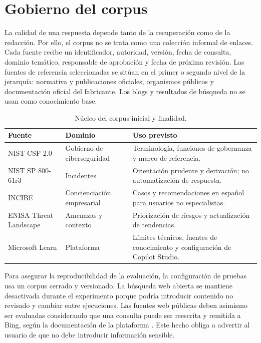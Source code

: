 \documentclass[12pt,twoside,titlepage]{book}
\begin{document}
\section{Gobierno del corpus}

La calidad de una respuesta depende tanto de la recuperaci\'on como de la redacci\'on. Por ello, el corpus no se trata como una colecci\'on informal de enlaces. Cada fuente recibe un identificador, autoridad, versi\'on, fecha de consulta, dominio tem\'atico, responsable de aprobaci\'on y fecha de pr\'oxima revisi\'on. Las fuentes de referencia seleccionadas se sit\'uan en el primer o segundo nivel de la jerarqu\'ia: normativa y publicaciones oficiales, organismos p\'ublicos y documentaci\'on oficial del fabricante. Los blogs y resultados de b\'usqueda no se usan como conocimiento base.

\begin{table}[H]
\centering
\small
\caption{N\'ucleo del corpus inicial y finalidad.}
\label{tab:corpus}
\begin{tabularx}{\textwidth}{p{}p{}X}
\toprule
\textbf{Fuente} & \textbf{Dominio} & \textbf{Uso previsto}\\
\midrule
NIST CSF 2.0 \cite{nistCsf2024} & Gobierno de ciberseguridad & Terminolog\'ia, funciones de gobernanza y marco de referencia.\\
NIST SP 800-61r3 \cite{nistIncident2025} & Incidentes & Orientaci\'on prudente y derivaci\'on; no automatizaci\'on de respuesta.\\
INCIBE \cite{incibeCrisis} & Concienciaci\'on empresarial & Casos y recomendaciones en espa\~nol para usuarios no especialistas.\\
ENISA Threat Landscape \cite{enisaThreat2025} & Amenazas y contexto & Priorizaci\'on de riesgos y actualizaci\'on de tendencias.\\
Microsoft Learn \cite{copilotKnowledge} & Plataforma & L\'imites t\'ecnicos, fuentes de conocimiento y configuraci\'on de Copilot Studio.\\
\bottomrule
\end{tabularx}
\end{table}

Para asegurar la reproducibilidad de la evaluaci\'on, la configuraci\'on de pruebas usa un corpus cerrado y versionado. La b\'usqueda web abierta se mantiene desactivada durante el experimento porque podr\'ia introducir contenido no revisado y cambiar entre ejecuciones. Las fuentes web p\'ublicas deben asimismo ser evaluadas considerando que una consulta puede ser reescrita y remitida a Bing, seg\'un la documentaci\'on de la plataforma \cite{copilotPublicWeb}. Este hecho obliga a advertir al usuario de que no debe introducir informaci\'on sensible.
\end{document}
